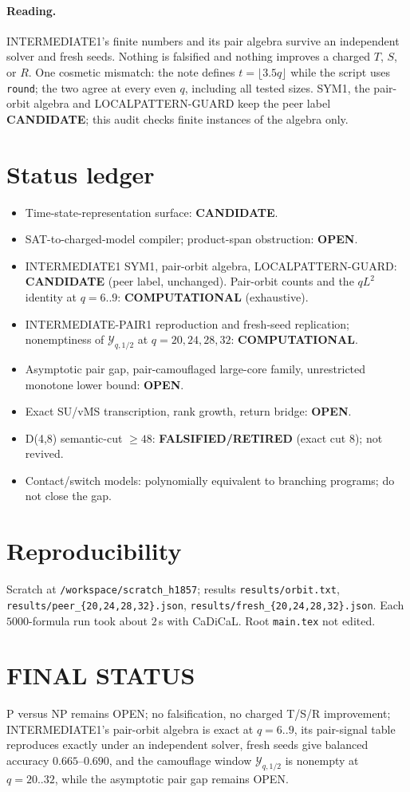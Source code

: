 \documentclass[11pt]{article}
\begin{document}
\paragraph{Reading.} INTERMEDIATE1's finite numbers and its pair algebra survive an independent solver and fresh seeds. Nothing is falsified and nothing improves a charged $T$, $S$, or $R$. One cosmetic mismatch: the note defines $t=\lfloor3.5q\rfloor$ while the script uses \texttt{round}; the two agree at every even $q$, including all tested sizes. SYM1, the pair-orbit algebra and LOCALPATTERN-GUARD keep the peer label \textbf{CANDIDATE}; this audit checks finite instances of the algebra only.

\section*{Status ledger}
\begin{itemize}
\item Time-state-representation surface: \textbf{CANDIDATE}.
\item SAT-to-charged-model compiler; product-span obstruction: \textbf{OPEN}.
\item INTERMEDIATE1 SYM1, pair-orbit algebra, LOCALPATTERN-GUARD: \textbf{CANDIDATE} (peer label, unchanged). Pair-orbit counts and the $qL^2$ identity at $q=6..9$: \textbf{COMPUTATIONAL} (exhaustive).
\item INTERMEDIATE-PAIR1 reproduction and fresh-seed replication; nonemptiness of $\mathcal Y_{q,1/2}$ at $q=20,24,28,32$: \textbf{COMPUTATIONAL}.
\item Asymptotic pair gap, pair-camouflaged large-core family, unrestricted monotone lower bound: \textbf{OPEN}.
\item Exact SU/vMS transcription, rank growth, return bridge: \textbf{OPEN}.
\item D(4,8) semantic-cut $\ge48$: \textbf{FALSIFIED/RETIRED} (exact cut 8); not revived.
\item Contact/switch models: polynomially equivalent to branching programs; do not close the gap.
\end{itemize}

\section*{Reproducibility}
Scratch at \texttt{/workspace/scratch\_h1857}; results \texttt{results/orbit.txt}, \texttt{results/peer\_\{20,24,28,32\}.json}, \texttt{results/fresh\_\{20,24,28,32\}.json}. Each $5000$-formula run took about $2$\,s with CaDiCaL. Root \texttt{main.tex} not edited.

\section*{FINAL STATUS}
P versus NP remains OPEN; no falsification, no charged T/S/R improvement; INTERMEDIATE1's pair-orbit algebra is exact at $q=6..9$, its pair-signal table reproduces exactly under an independent solver, fresh seeds give balanced accuracy $0.665$--$0.690$, and the camouflage window $\mathcal Y_{q,1/2}$ is nonempty at $q=20..32$, while the asymptotic pair gap remains OPEN.
\end{document}
